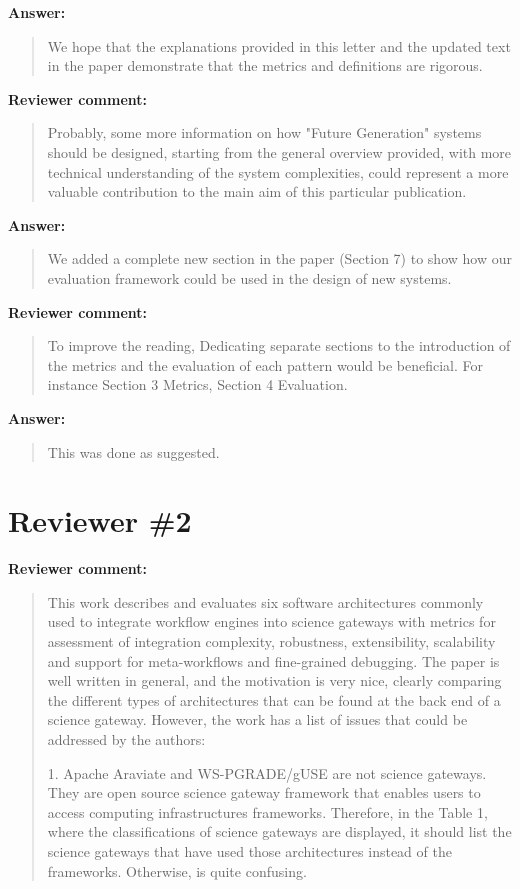 \documentclass[a4]{article}
\newenvironment{review}%
{\textbf{Reviewer comment:}\begin{quote}}%
{\end{quote}}%
\newenvironment{answer}%
{\textbf{Answer:}\begin{small}\begin{quote}}%
{\end{quote}\end{small}}%
\begin{document}
\begin{answer}
  We hope that the explanations provided in this letter and the
  updated text in the paper demonstrate that the metrics and
  definitions are rigorous.
\end{answer}

\begin{review}
  Probably, some more information on how "Future Generation" systems
  should be designed, starting from the general overview provided,
  with more technical understanding of the system complexities, could
  represent a more valuable contribution to the main aim of this
  particular publication.
\end{review}

\begin{answer}
  We added a complete new section in the paper (Section 7) to show how our
  evaluation framework could be used in the design of new systems.
\end{answer}

\begin{review}
  To improve the reading, Dedicating separate sections to the
  introduction of the metrics and the evaluation of each pattern would
  be beneficial. For instance Section 3 Metrics, Section 4 Evaluation.
\end{review}

\begin{answer}
  This was done as suggested.
\end{answer}

\section{Reviewer \#2}

\begin{review}
  This work describes and evaluates six software architectures
  commonly used to integrate workflow engines into science gateways
  with metrics for assessment of integration complexity, robustness,
  extensibility, scalability and support for meta-workflows and
  fine-grained debugging. The paper is well written in general, and
  the motivation is very nice, clearly comparing the different types
  of architectures that can be found at the back end of a science
  gateway. However, the work has a list of issues that could be
  addressed by the authors:

1. Apache Araviate and WS-PGRADE/gUSE are not science gateways. They
are open source science gateway framework that enables users to access
computing infrastructures frameworks. Therefore, in the Table 1, where
the classifications of science gateways are displayed, it should list
the science gateways that have used those architectures instead of the
frameworks. Otherwise, is quite confusing.
\end{review}
\end{document}
